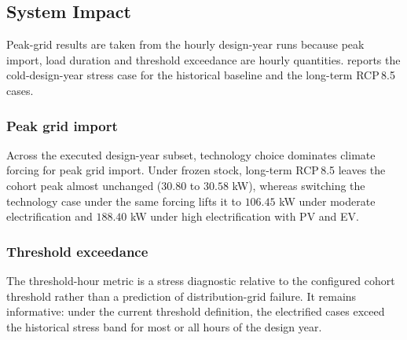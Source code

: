 \subsection{System Impact}
\label{sec:systemImpact}

Peak-grid results are taken from the hourly design-year runs because peak import, load duration and threshold exceedance are hourly quantities.  reports the cold-design-year stress case for the historical baseline and the long-term RCP\,8.5 cases.

\begin{table}[ht]
  \centering
  \footnotesize
  \caption{Cold-design-year grid-stress results for the hourly 30-household runs.}
  \label{tab:peak_grid_import_results}
\end{table}

\subsubsection*{Peak grid import}
Across the executed design-year subset, technology choice dominates climate forcing for peak grid import. Under frozen stock, long-term RCP\,8.5 leaves the cohort peak almost unchanged ($30.80$ to $30.58$ kW), whereas switching the technology case under the same forcing lifts it to $106.45$ kW under moderate electrification and $188.40$ kW under high electrification with PV and EV.

\subsubsection*{Threshold exceedance}
The threshold-hour metric is a stress diagnostic relative to the configured cohort threshold rather than a prediction of distribution-grid failure. It remains informative: under the current threshold definition, the electrified cases exceed the historical stress band for most or all hours of the design year.


